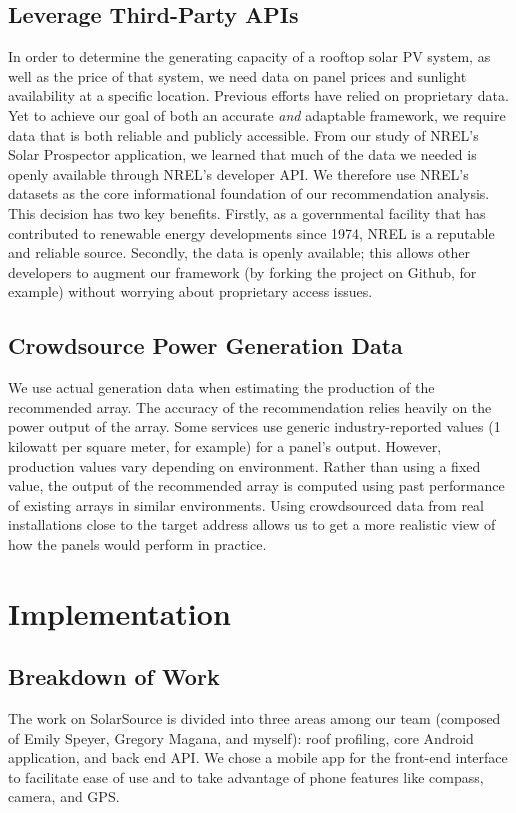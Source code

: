 \documentclass[pageno]{jpaper}
\begin{document}
\subsection{Leverage Third-Party APIs}
In order to determine the generating capacity of a rooftop solar PV system, as well as the price of that system, we need data on panel prices and sunlight availability at a specific location. Previous efforts have relied on proprietary data. Yet to achieve our goal of both an accurate {\em and} adaptable framework, we require data that is both reliable and publicly accessible. From our study of NREL's Solar Prospector application, we learned that much of the data we needed is openly available through NREL's developer API. We therefore use NREL's datasets as the core informational foundation of our recommendation analysis. This decision has two key benefits. Firstly, as a governmental facility that has contributed to renewable energy developments since 1974, NREL is a reputable and reliable source. Secondly, the data is openly available; this allows other developers to augment our framework (by forking the project on Github, for example) without worrying about proprietary access issues.

\subsection{Crowdsource Power Generation Data}
We use actual generation data when estimating the production of the recommended array. The accuracy of the recommendation relies heavily on the power output of the array. Some services use generic industry-reported values (1 kilowatt per square meter, for example) for a panel's output. However, production values vary depending on environment. Rather than using a fixed value, the output of the recommended array is computed using past performance of existing arrays in similar environments. Using crowdsourced data from real installations close to the target address allows us to get a more realistic view of how the panels would perform in practice.

\bigskip
\bigskip

\section{Implementation}
\subsection{Breakdown of Work}
The work on SolarSource is divided into three areas among our team (composed of Emily Speyer, Gregory Magana, and myself): roof profiling, core Android application, and back end API. We chose a mobile app for the front-end interface to facilitate ease of use and to take advantage of phone features like compass, camera, and GPS.
\end{document}
